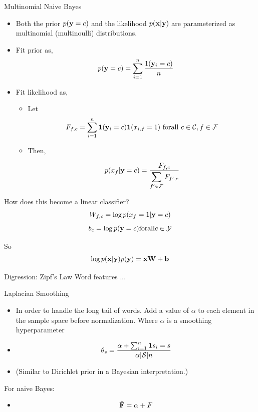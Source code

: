 \documentclass{beamer}
\begin{document}
\begin{frame}{Multinomial Naive Bayes}
  \begin{itemize}
  \item  Both the prior $p(\mathbf{y} = c)$ and the likelihood $p(\mathbf{x} | \mathbf{y})$ are
    parameterized as multinomial (multinoulli) distributions.
    
  \item Fit prior as,
    \[p(\mathbf{y} = c) = \sum_{i = 1}^n \frac{1(\mathbf{y}_i = c)}{n}\]
    
  \item Fit likelihood as,
    \begin{itemize}
      \item Let \[F_{f,c} = \sum_{i = 1}^n \mathbf{1}(\mathbf{y}_i = c) \mathbf{1}(x_{i, f} = 1) \mathrm{\ for all\ } c\in \mathcal{C}, f\in \mathcal{F}\] 
      \item Then,
      
      \[p(x_f | \mathbf{y}=c) = \frac{F_{f, c}}{\displaystyle \sum_{f' \in \mathcal{F}} F_{f',c}}  \]     
    \end{itemize}
  \end{itemize}

    How does this become a linear classifier? 
  \[ W_{f, c} =  \log p(x_f = 1 | \mathbf{y}=c)  \] 
  \[ b_c = \log p(\mathbf{y}=c)  \mathrm{ for all  }c\in \mathcal{Y} \] 

  So 
  \[\log p(\mathbf{x} | \mathbf{y}) p(\mathbf{y}) =  \mathbf{x} \mathbf{W} + \mathbf{b}  \]
\end{frame}


\begin{frame}{Digression: Zipf's Law}
  Word features ... 
\end{frame}

\begin{frame}{Laplacian Smoothing}
  \begin{itemize}
  \item   In order to handle the long tail of words. 
    Add a value of $\alpha$ to each element in the sample space before normalization.
    Where $\alpha$ is a smoothing hyperparameter 
  \item 
    \[ \theta_s =  \frac{\alpha + \sum_{i=1}^n \mathbf{1}{s_i = s}}{\alpha|\mathcal{S}| n} \]
    
  \item (Similar to Dirichlet prior in a Bayesian interpretation.) 
  \end{itemize}

  For naive Bayes:
  \begin{itemize}
  \item \[\hat{\mathbf{F}} = \alpha + F\]
  \end{itemize}
\end{frame}
\end{document}
